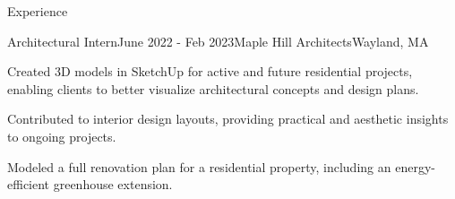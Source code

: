 \documentclass[
    a4paper,
    9pt,
]{resume}
\begin{document}
\begin{rSection}{Experience}




	\begin{rSubsection}{Architectural Intern}{June 2022 - Feb 2023}{Maple Hill Architects}{Wayland, MA}
		\item Created 3D models in SketchUp for active and future residential projects, enabling clients to better visualize architectural concepts and design plans.
		\item Contributed to interior design layouts, providing practical and aesthetic insights to ongoing projects.
		\item Modeled a full renovation plan for a residential property, including an energy-efficient greenhouse extension.
	\end{rSubsection}
	
%		
	
\end{rSection}
\end{document}
